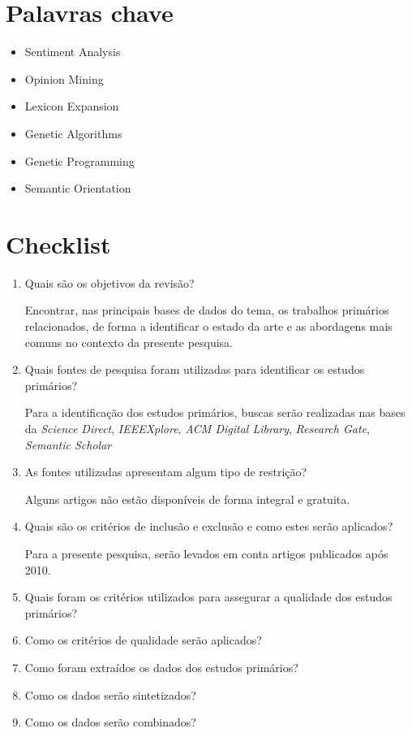 \documentclass[a4paper,11pt]{article}
\begin{document}
\section{Palavras chave}
\begin{itemize}
	\item{Sentiment Analysis}
	\item{Opinion Mining}
	\item{Lexicon Expansion}
	\item{Genetic Algorithms}
	\item{Genetic Programming}
	\item{Semantic Orientation}
\end{itemize}

\section{Checklist}
\begin{enumerate}
\item{Quais são os objetivos da revisão?}

Encontrar, nas principais bases de dados do tema, os trabalhos primários relacionados, de forma a identificar o estado da arte e as abordagens mais comuns no contexto da presente pesquisa.

\item{Quais fontes de pesquisa foram utilizadas para identificar os estudos primários?}

Para a identificação dos estudos primários, buscas serão realizadas nas bases da \emph{Science Direct}, \emph{IEEEXplore}, \emph{ACM Digital Library}, \emph{Research Gate}, \emph{Semantic Scholar}

\item{As fontes utilizadas apresentam algum tipo de restrição?}

Alguns artigos não estão disponíveis de forma integral e gratuita. 
\item{Quais são os critérios de inclusão e exclusão e como estes serão aplicados?}

Para a presente pesquisa, serão levados em conta artigos publicados após 2010.

\item{Quais foram os critérios utilizados para assegurar a qualidade dos estudos primários?}

\item{Como os critérios de qualidade serão aplicados?}

\item{Como foram extraídos os dados dos estudos primários?}

\item{Como os dados serão sintetizados?}

\item{Como os dados serão combinados?}

\end{enumerate}


\end{document}
